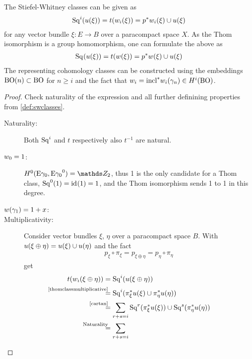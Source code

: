 \begin{Thm}\label{altdefswclasses}
  The Stiefel-Whitney classes can be given as
  \begin{gather*}
    \mathrm{Sq}^{i}(u(\xi)) = t(w_i(\xi)) = {p}^* w_i(\xi) \cup u(\xi)
  \end{gather*}
  for any vector bundle $\xi\colon E\to B$ over a paracompact space
  $X$. As the Thom isomorphism is a group homomorphism, one can
  formulate the above as
  \begin{gather*}
    \mathrm{Sq}^{}(u(\xi)) = t(w(\xi)) = {p}^* w(\xi) \cup u(\xi)
  \end{gather*}
  The representing cohomology classes can be constructed using the
  embeddings $\mathrm{BO}(n)\subset\mathrm{BO}$ for $n\geq i$ and the fact that
  $w_i={\mathrm{incl}}^*w_i(\gamma_n)\in H^i(\mathrm{BO})$. %
  \begin{proof}
    Check naturality of the expression and all further
    definining properties from \ref{def:swclasses}.
    \begin{description}
    \item[Naturality:] Both $\mathrm{Sq}^{i}$ and $t$ respectively also $t^{-1}$
      are natural.
    \item[$w_0=1$:]
      $H^0(\thomspacepair{\E{\gamma_0}}) = \Zmod2$, thus 1 is the only
      candidate for a Thom class, $\mathrm{Sq}^{0}(1) = \mathrm{id}_{}(1) = 1$, and the Thom
      isomorphism sends 1 to 1 in this degree.
    \item[$w(\gamma_1)=1+x$:] %
    \item[Multiplicativity:] %
      Consider vector bundles $\xi$, $\eta$ over a paracompact space
      $B$. With $u(\xi\oplus\eta)=u(\xi)\cup u(\eta)$ and the fact
      \begin{gather}\label{projectionscommute}
        p_\xi\circ\pi_\xi = p_{\xi\oplus\eta} = p_\eta\circ\pi_\eta
      \end{gather}
      get
      \begin{align*}
        \thomiso(\w_i(\xi\oplus\eta))
        &= \Sq i(\u(\xi\oplus\eta)) \\
        &\overset{\mathllap{\text{\autoref{thomclassmultiplicative}}}}=
          \Sq i(\pb\pi_\xi\u(\xi) \cup \pb\pi_\eta\u(\eta))\\
        &\overset{\mathllap{\text{\ref{cartan}}}}=
          \sum_{r+s=i}
          \Sq r(\pb\pi_\xi\u(\xi)) \cup \Sq s(\pb \pi_\eta\u(\eta)) \\
        &\overset{\mathllap{\text{Naturality}}}=
          \sum_{r+s=i}

\end{align*}
\end{description}
\end{proof}
\end{Thm}

